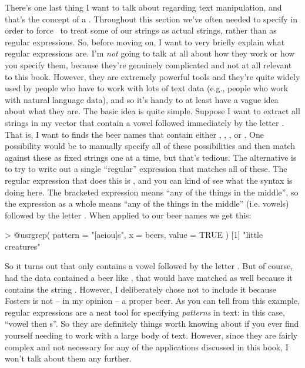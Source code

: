 
There's one last thing I want to talk about regarding text manipulation, and that's the concept of a . Throughout this section we've often needed to specify  in order to force \R\ to treat some of our strings as actual strings, rather than as regular expressions. So, before moving on, I want to very briefly explain what regular expressions are. I'm {\it not} going to talk at all about how they work or how you specify them, because they're genuinely complicated and not at all relevant to this book. However, they are extremely powerful tools and they're quite widely used by people who have to work with lots of text data (e.g., people who work with natural language data), and so it's handy to at least have a vague idea about what they are. The basic idea is quite simple. Suppose I want to extract all strings in my  vector that contain a vowel followed immediately by the letter . That is, I want to finds the beer names that contain either , , ,  or . One possibility would be to manually specify all of these possibilities and then match against these as fixed strings one at a time, but that's tedious. The alternative is to try to write out a single ``regular'' expression that matches all of these. The regular expression that does this is , and you can kind of see what the syntax is doing here. The bracketed expression means ``any of the things in the middle'', so the expression as a whole means ``any of the things in the middle'' (i.e. vowels) followed by the letter . When applied to our beer names we get this:
\begin{rblock1}
> @usr{grep( pattern = "[aeiou]s", x = beers, value = TRUE )}
[1] "little creatures"
\end{rblock1} 
So it turns out that only  contains a vowel followed by the letter . But of course, had the data contained a beer like , that would have matched as well because it contains the string . However, I deliberately chose not to include it because Fosters is not -- in my opinion -- a proper beer. As you can tell from this example, regular expressions are a neat tool for specifying {\it patterns} in text: in this case, ``vowel then s''. So they are definitely things worth knowing about if you ever find yourself needing to work with a large body of text. However, since they are fairly complex and not necessary for any of the applications discussed in this book, I won't talk about them any further. 


